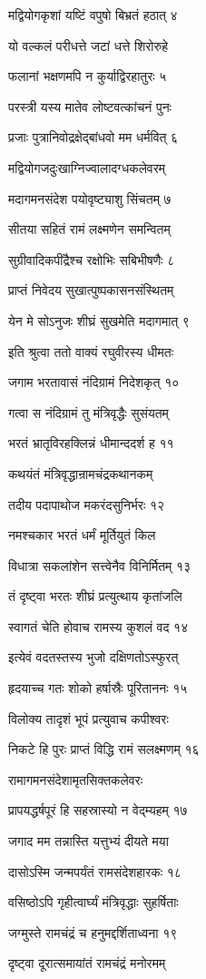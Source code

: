 मद्वियोगकृशां यष्टिं वपुषो बिभ्रतं हठात् ४

यो वल्कलं परीधत्ते जटां धत्ते शिरोरुहे

फलानां भक्षणमपि न कुर्याद्विरहातुरः ५

परस्त्री यस्य मातेव लोष्टवत्कांचनं पुनः

प्रजाः पुत्रानिवोद्रक्षेद्बांधवो मम धर्मवित् ६

मद्वियोगजदुःखाग्निज्वालादग्धकलेवरम्

मदागमनसंदेश पयोवृष्ट्याशु सिंचतम् ७

सीतया सहितं रामं लक्ष्मणेन समन्वितम्

सुग्रीवादिकपींद्रैश्च रक्षोभिः सबिभीषणैः ८

प्राप्तं निवेदय सुखात्पुष्पकासनसंस्थितम्

येन मे सोऽनुजः शीघ्रं सुखमेति मदागमात् ९

इति श्रुत्वा ततो वाक्यं रघुवीरस्य धीमतः

जगाम भरतावासं नंदिग्रामं निदेशकृत् १०

गत्वा स नंदिग्रामं तु मंत्रिवृद्धैः सुसंयतम्

भरतं भ्रातृविरहक्लिन्नं धीमान्ददर्श ह ११

कथयंतं मंत्रिवृद्धान्रामचंद्रकथानकम्

तदीय पदापाथोज मकरंदसुनिर्भरः १२

नमश्चकार भरतं धर्मं मूर्तियुतं किल

विधात्रा सकलांशेन सत्त्वेनैव विनिर्मितम् १३

तं दृष्ट्वा भरतः शीघ्रं प्रत्युत्थाय कृतांजलि

स्वागतं चेति होवाच रामस्य कुशलं वद १४

इत्येवं वदतस्तस्य भुजो दक्षिणतोऽस्फुरत्

हृदयाच्च गतः शोको हर्षास्रैः पूरिताननः १५

विलोक्य तादृशं भूपं प्रत्युवाच कपीश्वरः

निकटे हि पुरः प्राप्तं विद्धि रामं सलक्ष्मणम् १६

रामागमनसंदेशामृतसिक्तकलेवरः

प्रापयद्धर्षपूरं हि सहस्रास्यो न वेद्म्यहम् १७

जगाद मम तन्नास्ति यत्तुभ्यं दीयते मया

दासोऽस्मि जन्मपर्यंतं रामसंदेशहारकः १८

वसिष्ठोऽपि गृहीत्वार्घ्यं मंत्रिवृद्धाः सुहर्षिताः

जग्मुस्ते रामचंद्रं च हनुमद्दर्शिताध्वना १९

दृष्ट्वा दूरात्समायांतं रामचंद्रं मनोरमम्


